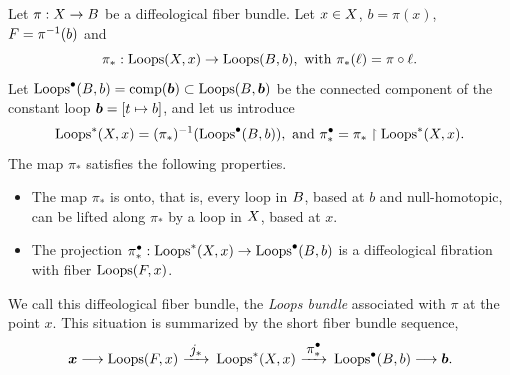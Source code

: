 \begin{article}
  \label{Associated-loops-fiber-bundles}
  Let $\pi : X \to B$ be a diffeological fiber bundle.
  Let $x \in X$, $b = \pi(x)$, $F = \pi^{-1}(b)$ and
  $$%
  \pi_* : \Loops(\X,x) \to \Loops(\B,b), \text{ with } \pi_*(\ell) = \pi \circ \ell.
  $$%
  Let $\operatorname{Loops}^\bullet(B,b) = \operatorname{comp}({\boldsymbol b}) \subset \operatorname{Loops}(B,{\boldsymbol b})$ be the connected component of the constant loop ${\boldsymbol b} = [t \mapsto b]$,
  and let us introduce
  $$%
  \Loops^*(\X,x) = (\pi_*)^{-1}(\Loops^\bullet(\B,b)), \text{ and } \pi_*^\bullet = \pi_* \restriction \Loops^*(\X,x).
  $$%
  The map $\pi_*$ satisfies the following properties.
  \begin{itemize}
    \item[($\diamondsuit$)] The map $\pi_*$ is onto,
    that is,
    every loop in $B$,
    based at $b$ and null-homotopic,
    can be lifted along $\pi_*$ by a loop in $X$,
    based at $x$.
    \item[($\heartsuit$)] The projection $\pi_*^\bullet : \operatorname{Loops}^*(X,x) \to \operatorname{Loops}^\bullet(B,b)$ is a diffeological fibration with fiber $\operatorname{Loops}(F,x)$.
  \end{itemize}
  We call this diffeological fiber bundle, the {\em Loops bundle} associated with $\pi$ at the point $x$.
  This situation is summarized by the short fiber bundle sequence,
  $$%
  \bmx \longrightarrow \Loops(\F,x) \rfl{j_*} \Loops^*(\X,x) \rfl{\pi_*^\bullet} \Loops^\bullet(\B,b) \longrightarrow \bmb.
  $$%
\end{article} %

